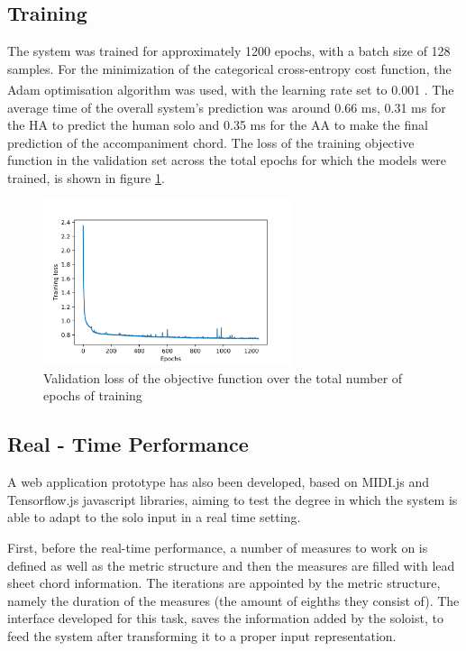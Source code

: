         \subsection{Training}
        The system was trained for approximately 1200 epochs, with a batch size of 128 samples.  For the minimization of the categorical cross-entropy cost function, the Adam\textsuperscript{\cite{adam2014}} optimisation algorithm was used, with the learning rate set to 0.001 . The average time of the overall system's prediction was around 0.66 ms, 0.31 ms for the HA to predict the human solo and 0.35 ms for the AA to make the final prediction of the accompaniment chord. The loss of the training objective function in the validation set across the total epochs for which the models were trained, is shown in figure \ref{fig:val_loss}. 

        \begin{figure}[h]
        \centering
        \includegraphics[width=0.65\textwidth]{media/epoch_val_loss_labels.png}
        \caption{Validation loss of the objective function over the total number of epochs of training}
        \label{fig:val_loss}
        \end{figure}

        \subsection{Real - Time Performance}
        A web application prototype has also been developed, based on MIDI.js and Tensorflow.js javascript libraries, aiming to test the degree in which the system is able to adapt to the solo input in a real time setting. 
    
        First, before the real-time performance, a number of measures to work on is defined as well as the metric structure and then the measures are filled with lead sheet chord information. The iterations are appointed by the metric structure, namely the duration of the measures (the amount of eighths they consist of). The interface developed for this task, saves the information added by the soloist, to feed the system after transforming it to a proper input representation.
        
